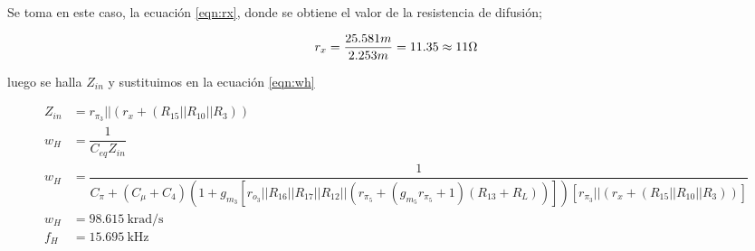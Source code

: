 \begin{enumerate}
\begin{itemize}
                Se toma en este caso, la ecuación \ref{eqn:rx}, donde se obtiene el valor de la resistencia de difusión;

                \begin{gather}
                  r_x=\dfrac{25.581 m}{2.253m}=11.35 \approx 11 \ohm
                \end{gather}


                luego se halla $Z_{in}$ y sustituimos en la ecuación \ref{eqn:wh}

                \begin{align*}
                  Z_{in} & =r_{\pi_3}||(r_{x}+(R_{15}||R_{10}||R_3))                                                                                                                                     \\[1cm]
                  w_{H}  & =\dfrac{1}{C_{eq}Z_{in}}                                                                                                                                                      \\[0.2cm]
                  w_{H}  & = \dfrac{1}{C_{\pi} + (C_{\mu} + C_{4})(1+g_{m_3}[r_{o_3}||R_{16}||R_{17}||R_{12}||(r_{\pi_5}+(g_{m_5}r_{\pi_5}+1)(R_{13}+R_L))]) [r_{\pi_3}||(r_{x}+(R_{15}||R_{10}||R_3))]} \\[0.2cm]
                  w_{H}  & =\SI{98.615}{\kilo\radian\per\second}                                                                                                                                         \\[0.2cm]
                  f_{H}  & =\SI{15.695}{\kilo\hertz}                                                                                                                                                     \\[0.2cm]
                \end{align*}

        \end{itemize}



\end{enumerate}
